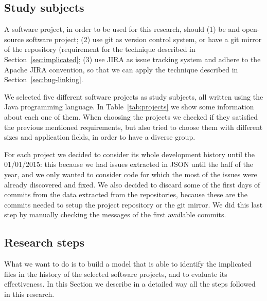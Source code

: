 
\subsection{Study subjects}
\label{sec:subjects}
A software project, in order to be used for this research, should (1) be and open-source software project; (2) use git as version control system, or have a git mirror of the repository (requirement for the technique described in Section~\ref{sec:implicated}; (3) use JIRA as issue tracking system and adhere to the Apache JIRA convention, so that we can apply the technique described in Section~\ref{sec:bug-linking}.

We selected five different software projects as study subjects, all written using the Java programming language. In Table~\ref{tab:projects} we show some information about each one of them. When choosing the projects we checked if they satisfied the previous mentioned requirements, but also tried to choose them with different sizes and application fields, in order to have a diverse group.

For each project we decided to  consider its whole development history until the 01/01/2015: this because we had issues extracted in JSON until the half of the year, and we only wanted to consider code for which the most of the issues were already discovered and fixed. We also decided to discard some of the first days of commits from the data extracted from the repositories, because these are the commits needed to setup the project repository or the git mirror. %
We did this last step by manually checking the messages of the first available commits.



\subsection{Research steps}

What we want to do is to build a model that is able to identify the implicated files in the history of the selected software projects, and to evaluate its effectiveness. In this Section we describe in a detailed way all the steps followed in this research.

